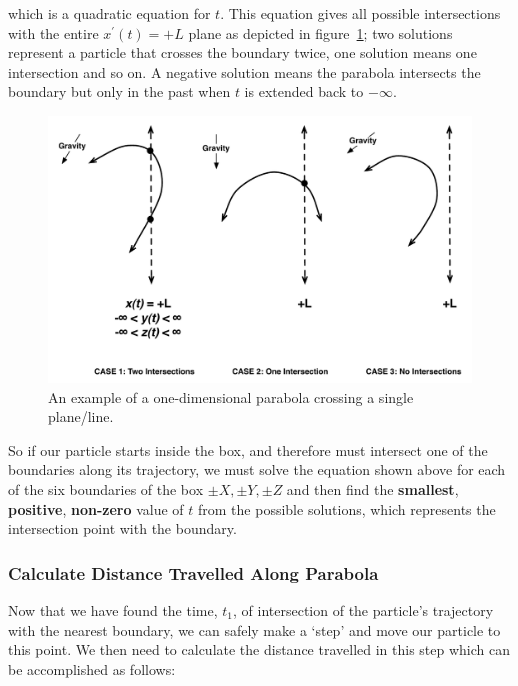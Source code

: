 \documentclass[11pt,a4paper,oneside]{article}
\begin{document}
which is a quadratic equation for $t$. This equation gives all possible intersections with the entire $x^{\prime}(t) = +L$ plane as depicted in figure~\ref{fig:IntersectionWithPlane}; two solutions represent a particle that crosses the boundary twice, one solution means one intersection and so on. A negative solution means the parabola intersects the boundary but only in the past when $t$ is extended back to $-\infty$.

\begin{figure}[!htbp] 
\begin{center}
\includegraphics[scale=0.6]{designdocumentimages/fig3-IntersectionWithPlane}
\end{center}
\caption{An example of a one-dimensional parabola crossing a single plane/line.}
\label{fig:IntersectionWithPlane}
\end{figure}

So if our particle starts inside the box, and therefore must intersect one of the boundaries along its trajectory, we must solve the equation shown above for each of the six boundaries of the box $\pm X, \pm Y, \pm Z$ and then find the \textbf{smallest}, \textbf{positive}, \textbf{non-zero} value of $t$ from the possible solutions, which represents the intersection point with the boundary.

  
\subsubsection*{Calculate Distance Travelled Along Parabola}

Now that we have found the time, $t_{1}$, of intersection of the particle's trajectory with the nearest boundary, we can safely make a `step' and move our particle to this point. We then need to calculate the distance travelled in this step which can be accomplished as follows:
\end{document}
